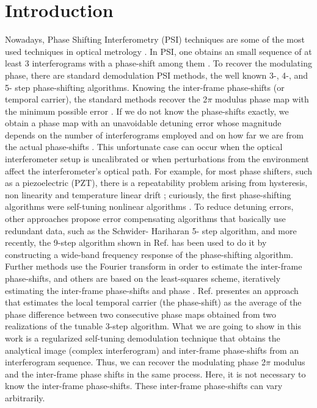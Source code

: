 \documentclass[letterpaper,12pt]{article}   %
\begin{document}
\section{Introduction}
Nowadays, Phase Shifting Interferometry (PSI) techniques are some of the most used 
techniques in optical metrology \cite{a1_OpticalTesting}. In PSI, one obtains an small 
sequence of at least 3 interferograms with a phase-shift among them 
\cite{a1_OpticalTesting}. To recover the modulating phase, there are standard 
demodulation PSI methods, the well known 3-, 4-, and 5- step phase-shifting algorithms. 
Knowing the inter-frame phase-shifts (or temporal carrier), the standard methods recover 
the 2$\pi$ modulus phase map with the minimum possible error 
\cite{a1_OpticalTesting,a2_F&K,a3}. If we do not know the phase-shifts exactly, we obtain 
a phase map with an unavoidable detuning error whose magnitude depends on the number of 
interferograms employed and on how far we are from the actual phase-shifts 
\cite{a3,a4,a5,a6}. This unfortunate case can occur when the optical interferometer setup 
is uncalibrated or when perturbations from the environment affect the interferometer's 
optical path. For example, for most phase shifters, such as a piezoelectric (PZT), there 
is a repeatability problem arising from hysteresis, non linearity and temperature linear 
drift \cite{a5,a7}; curiously, the first phase-shifting algorithms were self-tuning 
nonlinear algorithms \cite{a8,a9}. To reduce detuning errors, other approaches propose 
error compensating algorithms that basically use redundant data, such as the Schwider-
Hariharan 5- step algorithm, \cite{a4,a10,a11} and more recently, the 9-step algorithm 
shown in Ref. \cite{a12} has been used to do it by constructing a wide-band frequency 
response of the phase-shifting algorithm. Further methods use the Fourier transform in 
order to estimate the inter-frame phase-shifts, and others are based on the least-squares 
scheme, iteratively estimating the inter-frame phase-shifts and phase \cite{a13,a14}. 
Ref. \cite{a16} presentes an approach that estimates the local temporal carrier (the 
phase-shift) as the average of the phase difference between two consecutive phase maps 
obtained from two realizations of the tunable 3-step algorithm. What we are going to show 
in this work is a regularized self-tuning demodulation technique that obtains the 
analytical image (complex interferogram) and inter-frame phase-shifts from an 
interferogram sequence. Thus, we can recover the modulating phase 2$\pi$ modulus and the 
inter-frame phase shifts in the same process. Here, it is not necessary to know the 
inter-frame phase-shifts. These inter-frame phase-shifts can vary arbitrarily.
\end{document}
